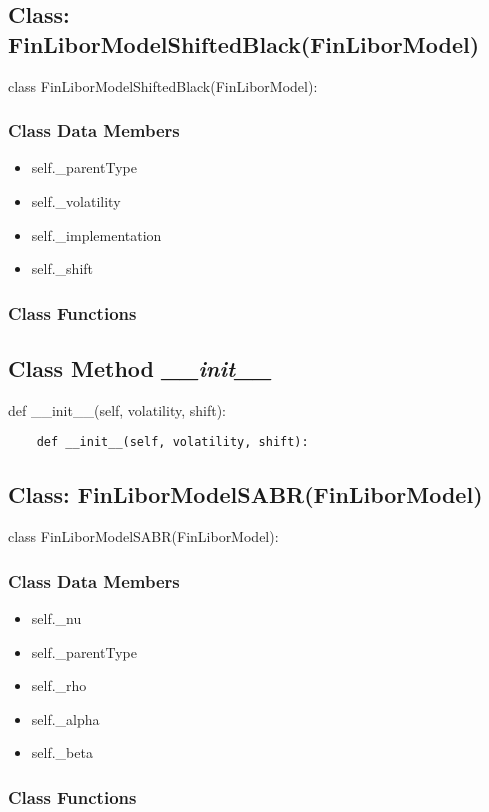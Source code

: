 \documentclass[twoside,11pt]{book}
\begin{document}
\subsection{Class: FinLiborModelShiftedBlack(FinLiborModel)}
class FinLiborModelShiftedBlack(FinLiborModel):

\subsubsection{Class Data Members}
\begin{itemize}
\item{self.\_parentType}
\item{self.\_volatility}
\item{self.\_implementation}
\item{self.\_shift}
\end{itemize}

\subsubsection{Class Functions}

\subsection{Class Method {\it \_\_init\_\_}}
def \_\_init\_\_(self, volatility, shift):

\begin{lstlisting}
    def __init__(self, volatility, shift):
\end{lstlisting}

\subsection{Class: FinLiborModelSABR(FinLiborModel)}
class FinLiborModelSABR(FinLiborModel):

\subsubsection{Class Data Members}
\begin{itemize}
\item{self.\_nu}
\item{self.\_parentType}
\item{self.\_rho}
\item{self.\_alpha}
\item{self.\_beta}
\end{itemize}

\subsubsection{Class Functions}
\end{document}
